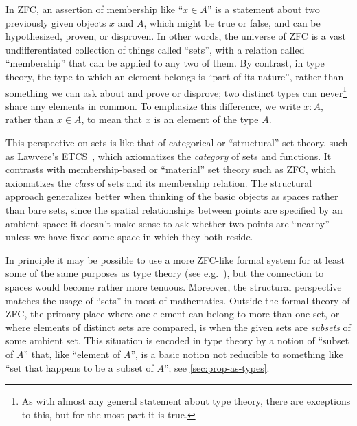 \documentclass[12pt]{article}
\numberwithin{equation}{section}
\begin{document}

In ZFC, an assertion of membership like ``$x\in A$'' is a statement about two previously given objects $x$ and $A$, which might be true or false, and can be hypothesized, proven, or disproven.
In other words, the universe of ZFC is a vast undifferentiated collection of things called ``sets'', with a relation called ``membership'' that can be applied to any two of them.
By contrast, in type theory, the type to which an element belongs is ``part of its nature'', rather than something we can ask about and prove or disprove; two distinct types can never\footnote{As with almost any general statement about type theory, there are exceptions to this, but for the most part it is true.} share any elements in common.
To emphasize this difference, we write $x:A$, rather than $x\in A$, to mean that $x$ is an element of the type $A$.

This perspective on sets is like that of categorical or ``structural'' set theory, such as Lawvere's ETCS~\cite{lawvere:etcs-long,leinster:etcs}, which axiomatizes the \emph{category} of sets and functions.
It contrasts with membership-based or ``material'' set theory such as ZFC, which axiomatizes the \emph{class} of sets and its membership relation.
The structural approach generalizes better when thinking of the basic objects as spaces rather than bare sets, since the spatial relationships between points are specified by an ambient space: it doesn't make sense to ask whether two points are ``nearby'' unless we have fixed some space in which they both reside.

In principle it may be possible to use a more ZFC-like formal system for at least some of the same purposes as type theory (see e.g.~\cite{abss:long-version}), but the connection to spaces would become rather more tenuous.
Moreover, the structural perspective matches the usage of ``sets'' in most of mathematics.
Outside the formal theory of ZFC, the primary place where one element can belong to more than one set, or where elements of distinct sets are compared, is when the given sets are \emph{subsets} of some ambient set.
This situation is encoded in type theory by a notion of ``subset of $A$'' that, like ``element of $A$'', is a basic notion not reducible to something like ``set that happens to be a subset of $A$''; see \cref{sec:prop-as-types}.
\end{document}
